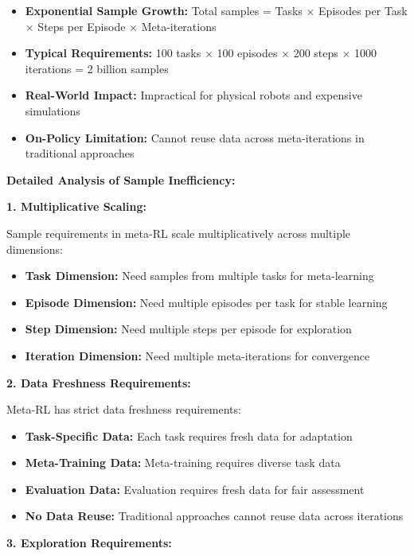 \documentclass[12pt]{article}
\newcommand{\ieee}[1]{\textcolor{IEEEBlue}{\textbf{#1}}}
\begin{document}
{{			\begin{itemize}
				\item \textbf{Exponential Sample Growth:} Total samples = Tasks × Episodes per Task × Steps per Episode × Meta-iterations
				\item \textbf{Typical Requirements:} 100 tasks × 100 episodes × 200 steps × 1000 iterations = 2 billion samples
				\item \textbf{Real-World Impact:} Impractical for physical robots and expensive simulations
				\item \textbf{On-Policy Limitation:} Cannot reuse data across meta-iterations in traditional approaches
			\end{itemize}
			
			\ieee{Detailed Analysis of Sample Inefficiency:}
			
			\textbf{1. Multiplicative Scaling:}
			
			Sample requirements in meta-RL scale multiplicatively across multiple dimensions:
			
			\begin{itemize}
				\item \textbf{Task Dimension:} Need samples from multiple tasks for meta-learning
				\item \textbf{Episode Dimension:} Need multiple episodes per task for stable learning
				\item \textbf{Step Dimension:} Need multiple steps per episode for exploration
				\item \textbf{Iteration Dimension:} Need multiple meta-iterations for convergence
			\end{itemize}
			
			\textbf{2. Data Freshness Requirements:}
			
			Meta-RL has strict data freshness requirements:
			
			\begin{itemize}
				\item \textbf{Task-Specific Data:} Each task requires fresh data for adaptation
				\item \textbf{Meta-Training Data:} Meta-training requires diverse task data
				\item \textbf{Evaluation Data:} Evaluation requires fresh data for fair assessment
				\item \textbf{No Data Reuse:} Traditional approaches cannot reuse data across iterations
			\end{itemize}
			
			\textbf{3. Exploration Requirements:}
			
}}
\end{document}
